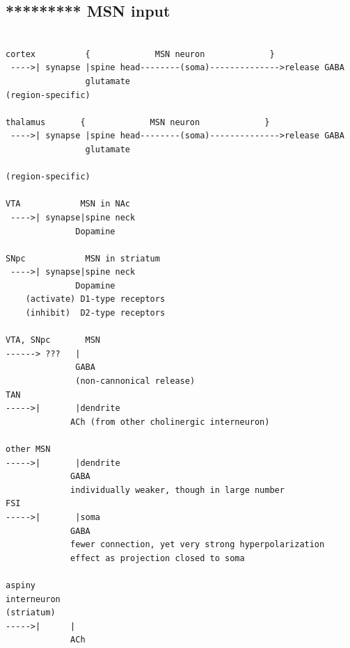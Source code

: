 \subsection{********* MSN input}
\label{sec:MSN-input}


\begin{Verbatim}[samepage=true]

cortex          {             MSN neuron             }
 ---->| synapse |spine head--------(soma)-------------->release GABA
                glutamate
(region-specific)

thalamus       {             MSN neuron             }
 ---->| synapse |spine head--------(soma)-------------->release GABA
                glutamate
                
(region-specific)

VTA            MSN in NAc
 ---->| synapse|spine neck
              Dopamine
 
SNpc            MSN in striatum
 ---->| synapse|spine neck
              Dopamine 
    (activate) D1-type receptors                 
    (inhibit)  D2-type receptors

VTA, SNpc       MSN
------> ???   |    
              GABA
              (non-cannonical release)
TAN
----->|       |dendrite
             ACh (from other cholinergic interneuron)

other MSN               
----->|       |dendrite
             GABA 
             individually weaker, though in large number 
FSI
----->|       |soma
             GABA 
             fewer connection, yet very strong hyperpolarization 
             effect as projection closed to soma

aspiny 
interneuron 
(striatum)
----->|      |
             ACh 
\end{Verbatim}


